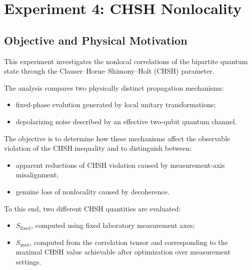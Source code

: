 
\newpage

\section{Experiment 4: CHSH Nonlocality}


\subsection*{Objective and Physical Motivation}

This experiment investigates the nonlocal correlations of the bipartite quantum state through the Clauser--Horne--Shimony--Holt (CHSH) parameter.

The analysis compares two physically distinct propagation mechanisms:

\begin{itemize}
    \item fixed-phase evolution generated by local unitary transformations;
    \item depolarizing noise described by an effective two-qubit quantum channel.
\end{itemize}

The objective is to determine how these mechanisms affect the observable violation of the CHSH inequality and to distinguish between:

\begin{itemize}
    \item apparent reductions of CHSH violation caused by measurement-axis misalignment;
    \item genuine loss of nonlocality caused by decoherence.
\end{itemize}

To this end, two different CHSH quantities are evaluated:

\begin{itemize}
    \item \(S_{\mathrm{fixed}}\), computed using fixed laboratory measurement axes;
    \item \(S_{\max}\), computed from the correlation tensor and corresponding to the maximal CHSH value achievable after optimization over measurement settings.
\end{itemize}

